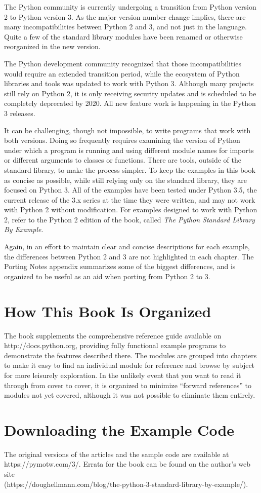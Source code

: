 The Python community is currently undergoing a transition from Python
version 2 to Python version 3. As the major version number change
implies, there are many incompatibilities between Python 2 and 3, and
not just in the language. Quite a few of the standard library modules
have been renamed or otherwise reorganized in the new version.

The Python development community recognized that those
incompatibilities would require an extended transition period, while
the ecosystem of Python libraries and tools was updated to work with
Python 3.  Although many projects still rely on Python 2, it is only
receiving security updates and is scheduled to be completely
deprecated by 2020. All new feature work is happening in the Python 3
releases.

It can be challenging, though not impossible, to write programs that
work with both versions. Doing so frequently requires examining the
version of Python under which a program is running and using different
module names for imports or different arguments to classes or
functions. There are tools, outside of the standard library, to make
the process simpler. To keep the examples in this book as concise as
possible, while still relying only on the standard library, they are
focused on Python 3.  All of the examples have been tested under
Python 3.5, the current release of the 3.x series at the time they
were written, and may not work with Python 2 without modification.
For examples designed to work with Python 2, refer to the Python 2
edition of the book, called \textit{The Python Standard Library By
  Example}.

Again, in an effort to maintain clear and concise descriptions for
each example, the differences between Python 2 and 3 are not
highlighted in each chapter. The Porting Notes appendix summarizes
some of the biggest differences, and is organized to be useful as an
aid when porting from Python 2 to 3.

\section*{How This Book Is Organized}

The book supplements the comprehensive reference guide available on
http://docs.python.org, providing fully functional example programs to
demonstrate the features described there. The modules are grouped into
chapters to make it easy to find an individual module for reference
and browse by subject for more leisurely exploration. In the unlikely
event that you want to read it through from cover to cover, it is
organized to minimize ``forward references'' to modules not yet
covered, although it was not possible to eliminate them entirely.

\section*{Downloading the Example Code}

The original versions of the articles and the sample code are
available at https://pymotw.com/3/.  Errata for the book can be found
on the author's web site\\
(https://doughellmann.com/blog/the-python-3-standard-library-by-example/).
